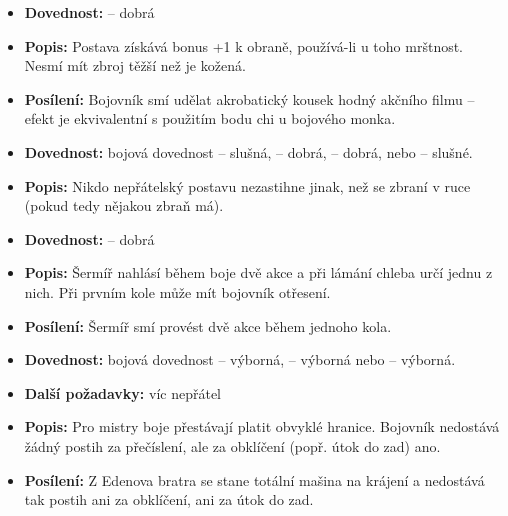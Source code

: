 \documentclass[../main.tex]{subfiles}
\begin{document}
\begin{specialita}
\begin{itemize}
	\item \textbf{Dovednost:}  – dobrá
	\item \textbf{Popis:} Postava získává bonus +1 k obraně, používá-li u toho mrštnost. Nesmí mít zbroj těžší než je kožená.
	\item \textbf{Posílení:} Bojovník smí udělat akrobatický kousek hodný akčního filmu – efekt je ekvivalentní s použitím bodu chi u bojového monka.
\end{itemize}
\end{specialita}

\begin{specialita}
\begin{itemize}
	\item \textbf{Dovednost:} bojová dovednost – slušná,  – dobrá,  – dobrá, nebo  – slušné.
	\item \textbf{Popis:} Nikdo nepřátelský postavu nezastihne jinak, než se zbraní v ruce (pokud tedy nějakou zbraň má).
\end{itemize}
\end{specialita}

\begin{specialita}[Předvídavost, IV]
\begin{itemize}
	\item \textbf{Dovednost:}  – dobrá
	\item \textbf{Popis:} Šermíř nahlásí během boje dvě akce a při lámání chleba určí jednu z nich. Při prvním kole může mít bojovník otřesení.
	\item \textbf{Posílení:} Šermíř smí provést dvě akce během jednoho kola.
\end{itemize}
\end{specialita}

\begin{specialita}
\begin{itemize}
	\item \textbf{Dovednost:} bojová dovednost – výborná,  – výborná nebo  – výborná.
	\item \textbf{Další požadavky:} víc nepřátel
	\item \textbf{Popis:} Pro mistry boje přestávají platit obvyklé hranice. Bojovník nedostává žádný postih za přečíslení, ale za obklíčení (popř. útok do zad) ano.
	\item \textbf{Posílení:} Z Edenova bratra se stane totální mašina na krájení a nedostává tak postih ani za obklíčení, ani za útok do zad.
\end{itemize}
\end{specialita}
\end{document}
